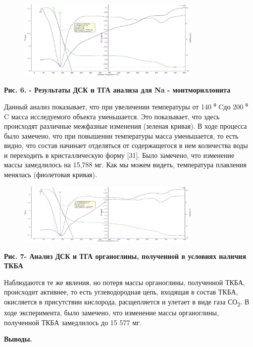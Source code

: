 \begin{figure}[H]
	\centering
	\includegraphics[width=0.8\textwidth]{assets/1031}
	\caption*{}
\end{figure}

\textbf{Рис. 6. - Результаты ДСК и ТГА анализа для Na - монтмориллонита}

Данный анализ показывает, что при увеличении температуры от 140 ⁰ Cдо
200 ⁰ C масса исследуемого объекта уменьшается. Это показывает, что
здесь происходят различные межфазные изменения (зеленая кривая). В ходе
процесса было замечено, что при повышении температуры масса уменьшается,
то есть видно, что состав начинает отделяться от содержащегося в нем
количества воды и переходить в кристаллическую форму {[}31{]}. Было
замечено, что изменение массы замедлилось на 15,788 мг. Как мы можем
видеть, температура плавления менялась (фиолетовая кривая).

\begin{figure}[H]
	\centering
	\includegraphics[width=0.8\textwidth]{assets/1032}
	\caption*{}
\end{figure}

\textbf{Рис. 7- Анализ ДСК и ТГА органоглины, полученной в условиях
наличия ТКБА}

Наблюдаются те же явления, но потеря массы органоглины, полученной ТКБА,
происходит активнее, то есть углеводородная цепь, входящая в состав
ТКБА, окисляется в присутствии кислорода, расщепляется и улетает в виде
газа СО\textsubscript{2}. В ходе эксперимента, было замечено, что
изменение массы органоглины, полученной ТКБА замедлилось до 15 577 мг.

\textbf{Выводы.}

